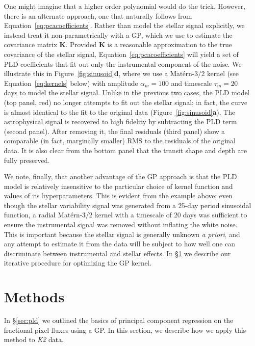 \documentclass[]{emulateapj}
\begin{document}
One might imagine that a higher order polynomial would do the trick. However, there
is an alternate approach, one that naturally follows from Equation~\ref{eq:pcacoefficients}.
Rather than model the stellar signal explicitly, we instead treat it non-parametrically
with a GP, which we use to estimate the covariance matrix $\mathbf{K}$. Provided
$\mathbf{K}$ is a reasonable approximation to the true covariance of the stellar signal,
Equation~\ref{eq:pcacoefficients} will yield a set of PLD coefficients that 
fit out only the instrumental component of the noise. We illustrate this in 
Figure~\ref{fig:sinusoid}\textbf{d}, where we use a Mat\'ern-3/2 kernel 
(see Equation~\ref{eq:kernels} below) with amplitude $\alpha_m = 100$ and timescale
$\tau_m = 20$ days to model the stellar signal. Unlike in the previous two cases,
the PLD model (top panel, red) no longer attempts to fit out the stellar signal; in 
fact, the curve is almost identical to the fit to the original data 
(Figure~\ref{fig:sinusoid}\textbf{a}). The astrophysical signal is
recovered to high fidelity by subtracting the PLD term (second panel). After removing it,
the final residuals (third panel) show a comparable (in fact, marginally smaller) RMS to the
residuals of the original data. It is also clear from the bottom panel that the transit 
shape and depth are fully preserved.

We note, finally, that another advantage of the GP approach is that the PLD model is
relatively insensitive to the particular choice of kernel function and values of its
hyperparameters. This is evident from the example above; even though the stellar
variability signal was generated from a 25-day period sinusoidal function, a radial
Mat\'ern-3/2 kernel with a timescale of 20 days was sufficient to ensure the instrumental
signal was removed without inflating the white noise. This is important because the
stellar signal is generally unknown \emph{a priori}, and any attempt to estimate it from the data
will be subject to how well one can discriminate between instrumental and stellar effects.
In \S\ref{sec:methods} we describe our iterative procedure for optimizing the GP kernel.

\section{Methods}
\label{sec:methods}
In \S\ref{sec:pld} we outlined the basics of principal component regression
on the fractional pixel fluxes using a GP. In this section, we describe how we apply
this method to \emph{K2} data.
\end{document}
